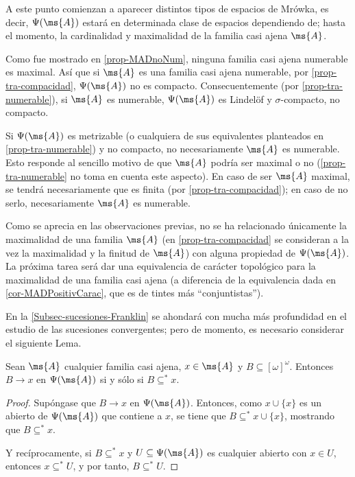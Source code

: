 	A este punto comienzan a aparecer distintos tipos de espacios de Mrówka, es decir, $\Psi(\ms{A})$ estará en determinada clase de espacios dependiendo de; hasta el momento, la cardinalidad y maximalidad de la familia casi ajena $\ms{A}$.
	
	Como fue mostrado en \ref{prop-MADnoNum}, ninguna familia casi ajena numerable es maximal. Así que si $\ms{A}$ es una familia casi ajena numerable, por \ref{prop-tra-compacidad}, $\Psi(\ms{A})$ no es compacto. Consecuentemente (por \ref{prop-tra-numerable}), si $\ms{A}$ es numerable, $\Psi(\ms{A})$ es Lindelöf y $\sigma$-compacto, no compacto.
	
	\begin{observacion}
		Si $\Psi(\ms{A})$ es metrizable (o cualquiera de sus equivalentes planteados en \ref{prop-tra-numerable}) y no compacto, no necesariamente $\ms{A}$ es numerable. Esto responde al sencillo motivo de que $\ms{A}$ podría ser maximal o no (\ref{prop-tra-numerable} no toma en cuenta este aspecto). En caso de ser $\ms{A}$ maximal, se tendrá necesariamente que es finita (por \ref{prop-tra-compacidad}); en caso de no serlo, necesariamente $\ms{A}$ es numerable.
	\end{observacion}
	
	Como se aprecia en las observaciones previas, no se ha relacionado únicamente la maximalidad de una familia $\ms{A}$ (en \ref{prop-tra-compacidad} se consideran a la vez la maximalidad y la finitud de $\ms{A}$) con alguna propiedad de $\Psi(\ms{A})$. La próxima tarea será dar una equivalencia de carácter topológico para la maximalidad de una familia casi ajena (a diferencia de la equivalencia dada en \ref{cor-MADPositivCarac}, que es de tintes más ``conjuntistas'').
	
	En la \autoref{Subsec-sucesiones-Franklin} se ahondará con mucha más profundidad en el estudio de las sucesiones convergentes; pero de momento, es necesario considerar el siguiente Lema.
	
	\begin{lema}\label{lem-convObvia}
		Sean $\ms{A}$ cualquier familia casi ajena, $x \in \ms{A}$ y $B \subseteq [\omega]^\omega$. Entonces $B \to x$ en $\Psi(\ms{A})$ si y sólo si $B \subseteq ^* x$.
	\end{lema}

	\begin{proof} 
		Supóngase que $B \to x$ en $\Psi(\ms{A})$. Entonces, como $x \cup \{x\}$ es un abierto de $\Psi(\ms{A})$ que contiene a $x$, se tiene que $B \subseteq^* x \cup \{x\}$, mostrando que $B \subseteq^* x$.

		Y recíprocamente, si $B \subseteq^* x$ y $U \subseteq \Psi(\ms{A})$ es cualquier abierto con $x \in U$, entonces $x \subseteq^* U$, y por tanto, $B \subseteq^* U$.
	\end{proof}

